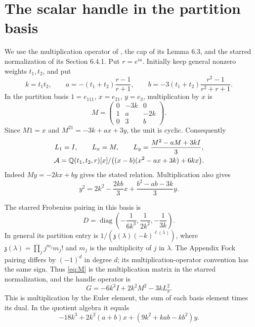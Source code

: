 \section{The scalar handle in the partition basis}\label{app:handle}
We use the multiplication operator of
\cite[Appendix, equations (29) and (31)]{BP}, the cap of its Lemma 6.3,
and the starred normalization of its Section 6.4.1.
Put $r=e^{iu}$. Initially keep general nonzero weights $t_1,t_2$, and put
\[
 k=t_1t_2,\qquad
 a=-(t_1+t_2)\frac{r-1}{r+1},\qquad
 b=-3(t_1+t_2)\frac{r^2-1}{r^2+r+1}.
\]
In the partition basis $1=e_{111}$, $x=e_{21}$, $y=e_3$,
multiplication by $x$ is
\begin{equation}\label{eq:M}
 M=\begin{pmatrix}0&-3k&0\\1&a&-2k\\0&3&b\end{pmatrix}.
\end{equation}
Since $M1=x$ and $M^21=-3k+ax+3y$, the unit is cyclic. Consequently
\begin{equation}\label{eq:algebra}
 \begin{gathered}
 L_1=I,\qquad L_x=M,\qquad L_y=\frac{M^2-aM+3kI}{3},\\
 \mathcal A=\mathbb Q(t_1,t_2,r)[x]/\bigl((x-b)(x^2-ax+3k)+6kx\bigr).
 \end{gathered}
\end{equation}
Indeed $My=-2kx+by$ gives the stated relation. Multiplication also gives
\[
 y^2=2k^2-\frac{2kb}{3}x+\frac{b^2-ab-3k}{3}y.
\]

The starred Frobenius pairing in this basis is
\begin{equation}\label{eq:metric}
 D=\operatorname{diag}\left(-\frac1{6k^3},\frac1{2k^2},-\frac1{3k}\right).
\end{equation}
In general its partition entry is
$1/(\mathfrak z(\lambda)(-k)^{\ell(\lambda)})$, where
$\mathfrak z(\lambda)=\prod_j j^{m_j}m_j!$ and $m_j$ is the
multiplicity of $j$ in $\lambda$. The Appendix Fock pairing differs
by $(-1)^d$ in degree $d$; its multiplication-operator convention
has the same sign. Thus \eqref{eq:M} is the multiplication matrix
in the starred normalization,
and the handle operator is
\begin{equation}\label{eq:handle}
 G=-6k^3I+2k^2M^2-3kL_y^2.
\end{equation}
This is multiplication by the Euler element, the sum of each basis
element times its dual. In the quotient algebra it equals
\[
 -18k^3+2k^2(a+b)x+(9k^2+kab-kb^2)y.
\]

